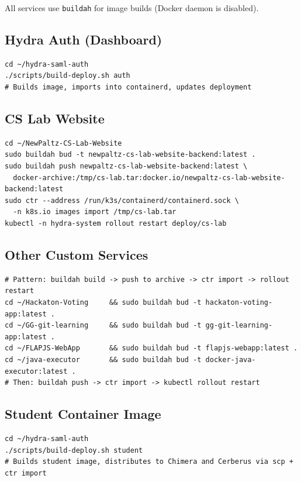 \documentclass[11pt,a4paper]{article}
\begin{document}
All services use \texttt{buildah} for image builds (Docker daemon is disabled).

\subsection{Hydra Auth (Dashboard)}

\begin{lstlisting}[style=bash]
cd ~/hydra-saml-auth
./scripts/build-deploy.sh auth
# Builds image, imports into containerd, updates deployment
\end{lstlisting}

\subsection{CS Lab Website}

\begin{lstlisting}[style=bash]
cd ~/NewPaltz-CS-Lab-Website
sudo buildah bud -t newpaltz-cs-lab-website-backend:latest .
sudo buildah push newpaltz-cs-lab-website-backend:latest \
  docker-archive:/tmp/cs-lab.tar:docker.io/newpaltz-cs-lab-website-backend:latest
sudo ctr --address /run/k3s/containerd/containerd.sock \
  -n k8s.io images import /tmp/cs-lab.tar
kubectl -n hydra-system rollout restart deploy/cs-lab
\end{lstlisting}

\subsection{Other Custom Services}

\begin{lstlisting}[style=bash]
# Pattern: buildah build -> push to archive -> ctr import -> rollout restart
cd ~/Hackaton-Voting     && sudo buildah bud -t hackaton-voting-app:latest .
cd ~/GG-git-learning     && sudo buildah bud -t gg-git-learning-app:latest .
cd ~/FLAPJS-WebApp       && sudo buildah bud -t flapjs-webapp:latest .
cd ~/java-executor       && sudo buildah bud -t docker-java-executor:latest .
# Then: buildah push -> ctr import -> kubectl rollout restart
\end{lstlisting}

\subsection{Student Container Image}

\begin{lstlisting}[style=bash]
cd ~/hydra-saml-auth
./scripts/build-deploy.sh student
# Builds student image, distributes to Chimera and Cerberus via scp + ctr import
\end{lstlisting}
\end{document}
